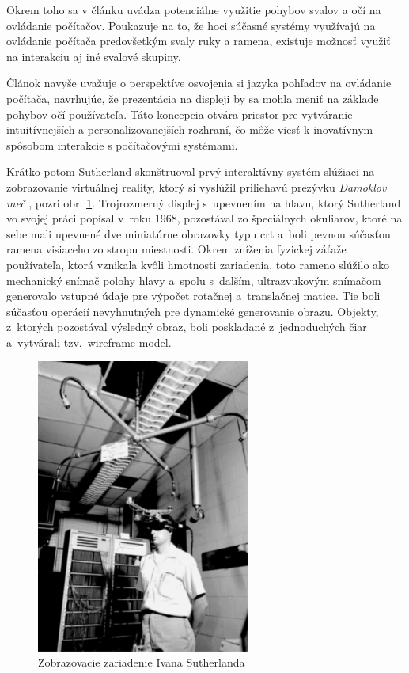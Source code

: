 Okrem toho sa v článku uvádza potenciálne využitie pohybov svalov a očí na ovládanie počítačov. Poukazuje na to, že hoci súčasné systémy využívajú na ovládanie 
počítača predovšetkým svaly ruky a ramena, existuje možnosť využiť na interakciu aj iné svalové skupiny. 

Článok navyše uvažuje o perspektíve osvojenia si jazyka pohľadov na ovládanie počítača, navrhujúc, že prezentácia na displeji by sa mohla meniť na základe pohybov 
očí používateľa. Táto koncepcia otvára priestor pre vytváranie intuitívnejších a personalizovanejších rozhraní, čo môže viesť k inovatívnym spôsobom interakcie 
s počítačovými systémami.

Krátko potom Sutherland skonštruoval prvý interaktívny systém slúžiaci na zobrazovanie virtuálnej reality, ktorý si vyslúžil priliehavú prezývku 
\emph{Damoklov meč} \cite[5]{schmalstiegAugmentedRealityPrinciples2016}, pozri obr. \ref{sutherland-device}. Trojrozmerný displej s~upevnením na hlavu, ktorý 
Sutherland vo svojej práci \cite{sutherlandHeadmountedThreeDimensional1968} popísal v~roku 1968, pozostával zo špeciálnych okuliarov, 
ktoré na sebe mali upevnené dve miniatúrne obrazovky typu \acrshort{crt} a~boli pevnou súčasťou ramena visiaceho zo stropu miestnosti. 
Okrem zníženia fyzickej záťaže používateľa, ktorá vznikala kvôli hmotnosti zariadenia, toto rameno slúžilo ako mechanický snímač polohy hlavy a~spolu s~ďalším, 
ultrazvukovým snímačom generovalo vstupné údaje pre výpočet rotačnej a~translačnej matice. Tie boli súčasťou operácií nevyhnutných pre dynamické generovanie obrazu. 
Objekty, z~ktorých pozostával výsledný obraz, boli poskladané z~jednoduchých čiar a~vytvárali tzv.~wireframe model.

\begin{figure}[!htbp]
  \centering
  \includegraphics[width=7cm]{img/display-device-Ivan-Sutherland-Harvard-University-1967.jpg}
  \caption{Zobrazovacie zariadenie Ivana Sutherlanda}
  \label{sutherland-device}
\end{figure}	

